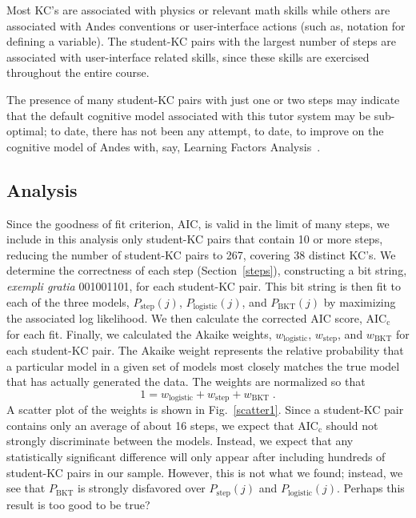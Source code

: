 \documentclass{acmlarge-edm}
\begin{document}
Most KC's are associated with physics
or relevant math skills while others are associated with 
Andes conventions or user-interface actions (such as, notation
for defining a variable).  The student-KC pairs with the largest 
number of steps are associated with user-interface related skills,
since these skills are exercised throughout the entire course. 

The presence of many student-KC pairs with just one or two
steps may indicate that the default cognitive model associated 
with this tutor system may be sub-optimal; to date, there has not 
been any attempt, to date, to improve on the cognitive model of 
Andes with, say, Learning Factors Analysis~\cite{cen_learning_2006}.

\subsection{Analysis}

Since the goodness of fit criterion, AIC, is valid in the limit 
of many steps, we include in this analysis only student-KC 
pairs that contain 10 or more steps, reducing the number of 
student-KC pairs to 267, covering 38 distinct KC's.
We determine the correctness of each step (Section~\ref{steps}),
constructing a bit string, {\em exempli gratia}
001001101, for each student-KC pair.  
This bit string is then fit to each of the three models,
$P_\mathrm{step}(j)$, $P_\mathrm{logistic}(j)$, and $P_\mathrm{BKT}(j)$ by
maximizing the associated log likelihood.  
We then calculate the corrected AIC score,
 AIC$_\mathrm{c}$~\cite{burnham_model_2002} for each fit.  
Finally, we calculated the Akaike weights, $w_\mathrm{logistic}$,
$w_\mathrm{step}$, and $w_\mathrm{BKT}$ for each student-KC pair.  
The Akaike weight represents the relative probability that
a particular model in a given set of models most closely matches
the true model that has actually generated the data.
The weights are normalized so that 
%
\begin{equation}
   1=w_\mathrm{logistic}+ w_\mathrm{step} + w_\mathrm{BKT} \; .
\end{equation}
%
A scatter plot of the weights is shown in Fig.~\ref{scatter1}.
Since a student-KC pair contains only an average of about 16 steps, we 
expect that AIC$_\mathrm{c}$ should not strongly
discriminate between the models.  Instead, we expect that
any statistically significant difference will only appear 
after including hundreds of student-KC pairs in our sample.  However, 
this is not what we found; instead, we see that $P_\mathrm{BKT}$ is 
strongly disfavored over $P_\mathrm{step}(j)$ and $P_\mathrm{logistic}(j)$.
Perhaps this result is too good to be true?
\end{document}
